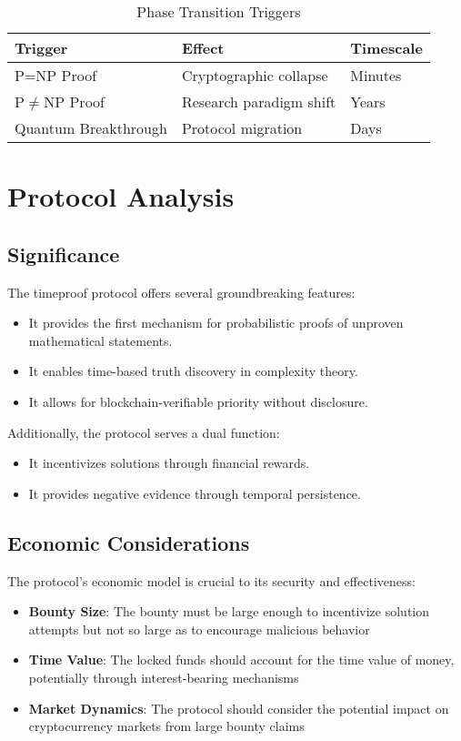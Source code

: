 \documentclass[12pt]{report}
\begin{document}
\begin{table}[h]
\centering
\caption{Phase Transition Triggers}
\begin{tabular}{|l|l|l|}
\hline
\textbf{Trigger} & \textbf{Effect} & \textbf{Timescale} \\ \hline
P=NP Proof & Cryptographic collapse & Minutes \\ 
P$\neq$NP Proof & Research paradigm shift & Years \\
Quantum Breakthrough & Protocol migration & Days \\ \hline
\end{tabular}
\end{table}

\section{Protocol Analysis}
\subsection{Significance}

The timeproof protocol offers several groundbreaking features:

\begin{itemize}
    \item It provides the first mechanism for probabilistic proofs of unproven mathematical statements.
    \item It enables time-based truth discovery in complexity theory.
    \item It allows for blockchain-verifiable priority without disclosure.
\end{itemize}

Additionally, the protocol serves a dual function:

\begin{itemize}
    \item It incentivizes solutions through financial rewards.
    \item It provides negative evidence through temporal persistence.
\end{itemize}

\subsection{Economic Considerations}
The protocol's economic model is crucial to its security and effectiveness:
\begin{itemize}
    \item \textbf{Bounty Size}: The bounty must be large enough to incentivize solution attempts but not so large as to encourage malicious behavior
    \item \textbf{Time Value}: The locked funds should account for the time value of money, potentially through interest-bearing mechanisms
    \item \textbf{Market Dynamics}: The protocol should consider the potential impact on cryptocurrency markets from large bounty claims
\end{itemize}
\end{document}
